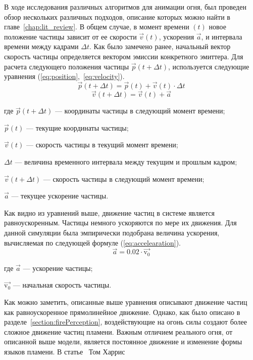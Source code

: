 В ходе исследования различных алгоритмов для анимации огня, был проведен обзор
нескольких различных подходов, описание которых можно найти в
главе~\ref{chap:lit_review}. В общем случае, в момент времени $(t)$ новое
положение частицы зависит от ее скорости $\vec{v}(t)$, ускорения $\vec{a}$, и интервала
времени между кадрами $\Delta t$. Как было замечено ранее, начальный вектор
скорость частицы определяется вектором эмиссии конкретного эмиттера. Для расчета
следующего положения частицы $\vec{p}(t + \Delta{t})$, используется следующие
уравнения (\ref{eq:position},~\ref{eq:velocity}).
\begin{equation}
  \label{eq:position}
  \vec{p}(t + \Delta{t}) = \vec{p}(t) + \vec{v}(t) \cdot \Delta{t}
\end{equation}
\vspace{-1em}
\begin{equation}
  \label{eq:velocity}
  \vec{v}(t + \Delta{t}) = \vec{v}(t) + \vec{a}
\end{equation}
\begin{explanationx}
    \item [где] $\vec{p}(t + \Delta{t})$ --- координаты частицы в следующий
        момент времени;
    \item $\vec{p}(t)$ --- текущие координаты частицы;
    \item $\vec{v}(t)$ --- скорость частицы в текущий момент времени;
    \item $\Delta{t}$ --- величина временного интервала между текущим и прошлым кадром;
    \item $\vec{v}(t + \Delta{t})$ --- скорость частицы в следующий момент времени;
    \item $\vec{a}$ --- текущее ускорение частицы.
\end{explanationx}

Как видно из уравнений выше, движение частиц в системе является равноускоренным.
Частицы немного ускоряются по мере их движения. Для данной симуляции была
эмпирически подобрана величина ускорения, вычисляемая по следующей формуле
(\ref{eq:accelearation}).
\begin{equation}
  \label{eq:accelearation}
  \vec{a} = 0.02 \cdot \vec{\text{v}_\text{0}}
\end{equation}
\begin{explanationx}
    \item [где] $\vec{a}$ --- ускорение частицы;
    \item $\vec{\text{v}_\text{0}}$ --- начальная скорость частицы.
\end{explanationx}

Как можно заметить, описанные выше уравнения описывают движение частиц как
равноускоренное прямолинейное движение. Однако, как было описано в
разделе~\ref{section:firePerception}, воздействующие на огонь силы создают более
сложное движение частиц пламени. Важным отличием реального огня, от описанной
выше модели, является постоянное движение и изменение формы языков пламени. В
статье~\cite{Harris} Том Харрис%
